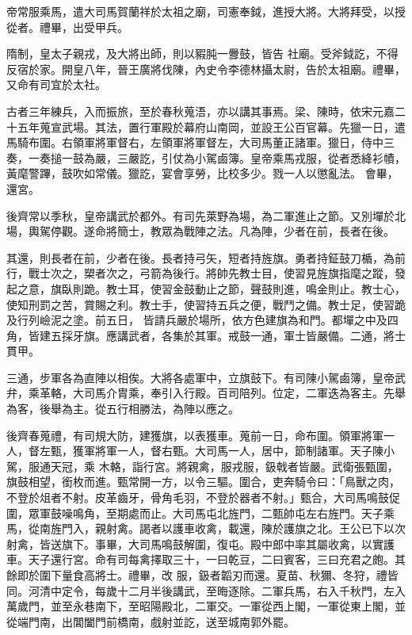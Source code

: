 \begin{pinyinscope}
 帝常服乘馬，遣大司馬賀蘭祥於太祖之廟，司憲奉鉞，進授大將。大將拜受，以授從者。禮畢，出受甲兵。



 隋制，皇太子親戎，及大將出師，則以豭肫一釁鼓，皆告
 社廟。受斧鉞訖，不得反宿於家。開皇八年，晉王廣將伐陳，內史令李德林攝太尉，告於太祖廟。禮畢，又命有司宜於太社。



 古者三年練兵，入而振旅，至於春秋蒐浯，亦以講其事焉。梁、陳時，依宋元嘉二十五年蒐宣武場。其法，置行軍殿於幕府山南岡，並設王公百官幕。先獵一日，遣馬騎布圍。右領軍將軍督右，左領軍將軍督左，大司馬董正諸軍。獵日，侍中三奏，一奏搥一鼓為嚴，三嚴訖，引仗為小駕鹵簿。皇帝乘馬戎服，從者悉絳衫幘，黃麾警蹕，鼓吹如常儀。獵訖，宴會享勞，比校多少。戮一人以懲亂法。
 會畢，還宮。



 後齊常以季秋，皇帝講武於都外。有司先萊野為場，為二軍進止之節。又別墠於北場，輿駕停觀。遂命將簡士，教眾為戰陣之法。凡為陣，少者在前，長者在後。



 其還，則長者在前，少者在後。長者持弓矢，短者持旌旗。勇者持鉦鼓刀楯，為前行，戰士次之，槊者次之，弓箭為後行。將帥先教士目，使習見旌旗指麾之蹤，發起之意，旗臥則跪。教士耳，使習金鼓動止之節，聲鼓則進，鳴金則止。教士心，使知刑罰之苦，賞賜之利。教士手，使習持五兵之便，戰鬥之備。教士足，使習跪及行列嶮泥之塗。前五日，
 皆請兵嚴於場所，依方色建旗為和門。都墠之中及四角，皆建五採牙旗。應講武者，各集於其軍。戒鼓一通，軍士皆嚴備。二通，將士貫甲。



 三通，步軍各為直陣以相俟。大將各處軍中，立旗鼓下。有司陳小駕鹵簿，皇帝武弁，乘革輅，大司馬介胄乘，奉引入行殿。百司陪列。位定，二軍迭為客主。先舉為客，後舉為主。從五行相勝法，為陣以應之。



 後齊春蒐禮，有司規大防，建獲旗，以表獲車。蒐前一日，命布圍。領軍將軍一人，督左甄，獲軍將軍一人，督右甄。大司馬一人，居中，節制諸軍。天子陳小駕，服通天冠，乘
 木輅，詣行宮。將親禽，服戎服，鈒戟者皆嚴。武衛張甄圍，旗鼓相望，銜枚而進。甄常開一方，以令三驅。圍合，吏奔騎令曰：「鳥獸之肉，不登於俎者不射。皮革齒牙，骨角毛羽，不登於器者不射。」甄合，大司馬鳴鼓促圍，眾軍鼓噪鳴角，至期處而止。大司馬屯北旌門，二甄帥屯左右旌門。天子乘馬，從南旌門入，親射禽。謁者以護車收禽，載還，陳於護旗之北。王公已下以次射禽，皆送旗下。事畢，大司馬鳴鼓解圍，復屯。殿中郎中率其屬收禽，以實護車。天子還行宮。命有司每禽擇取三十，一曰乾豆，二曰賓客，三曰充君之皰。其餘即於圍下量食高將士。禮畢，改
 服，鈒者韜刃而還。夏苗、秋獮、冬狩，禮皆同。河清中定令，每歲十二月半後講武，至晦逐除。二軍兵馬，右入千秋門，左入萬歲門，並至永巷南下，至昭陽殿北，二軍交。一軍從西上閣，一軍從東上閣，並從端門南，出閶闔門前橋南，戲射並訖，送至城南郭外罷。




\end{pinyinscope}
